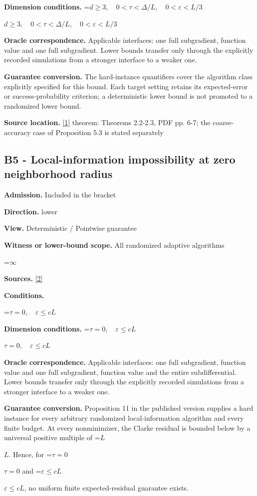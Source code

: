 \documentclass[10pt,a4paper]{article}
\newcommand{\AtlasMath}[1]{\par\begingroup\centering\setbox0=\hbox{$\displaystyle #1$}\ifdim\wd0>1.4\linewidth\typeout{ATLAS WIDE FORMULA: \the\wd0}\fi\ifdim\wd0>\linewidth\resizebox{\linewidth}{!}{\box0}\else\box0\fi\par\endgroup}
\newcommand{\AtlasInlineMath}[1]{\begingroup\setbox0=\hbox{$#1$}\ifdim\wd0>.4\linewidth\endgroup\AtlasMath{#1}\else\endgroup$#1$\fi}
\begin{document}
\textbf{Dimension conditions.} \AtlasInlineMath{d\ge3,\quad0<\tau<\Delta/L,\quad0<\varepsilon<L/3}

\textbf{Oracle correspondence.} Applicable interfaces: one full subgradient, function value and one full subgradient. Lower bounds transfer only through the explicitly recorded simulations from a stronger interface to a weaker one.

\textbf{Guarantee conversion.} The hard-instance quantifiers cover the algorithm class explicitly specified for this bound. Each target setting retains its expected-error or success-probability criterion; a deterministic lower bound is not promoted to a randomized lower bound.

\textbf{Source location.} \href{https://arxiv.org/pdf/2609.38082v2}{[1]} theorem: Theorems 2.2-2.3, PDF pp. 6-7; the coarse-accuracy case of Proposition 5.3 is stated separately

\subsection{B5 - Local-information impossibility at zero neighborhood radius}
\textbf{Admission.} Included in the bracket

\textbf{Direction.} lower

\textbf{View.} Deterministic / Pointwise guarantee

\textbf{Witness or lower-bound scope.} All randomized adaptive algorithms

\AtlasMath{\infty}
\textbf{Sources.} \href{https://www.jmlr.org/papers/volume23/21-1507/21-1507.pdf}{[2]}

\textbf{Conditions.} 
\AtlasMath{\tau=0,\quad\varepsilon\le cL}


\textbf{Dimension conditions.} \AtlasInlineMath{\tau=0,\quad\varepsilon\le cL}

\textbf{Oracle correspondence.} Applicable interfaces: one full subgradient, function value and one full subgradient, function value and the entire subdifferential. Lower bounds transfer only through the explicitly recorded simulations from a stronger interface to a weaker one.

\textbf{Guarantee conversion.} Proposition 11 in the published version supplies a hard instance for every arbitrary randomized local-information algorithm and every finite budget. At every nonminimizer, the Clarke residual is bounded below by a universal positive multiple of \AtlasInlineMath{L}. Hence, for \AtlasInlineMath{\tau=0} and \AtlasInlineMath{\varepsilon\le cL}, no uniform finite expected-residual guarantee exists.
\end{document}
